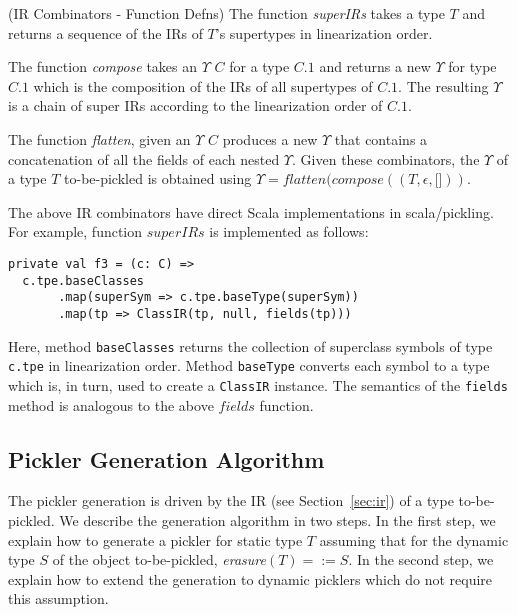 \begin{defn}{(IR Combinators - Function Defns)}
The function \textit{superIRs} takes a type $T$ and returns a sequence of the
IRs of $T$'s supertypes in linearization order.

The function \textit{compose} takes an $\Upsilon$ $C$ for a type $C.1$ and returns a
new $\Upsilon$ for type $C.1$ which is the composition of the IRs of all supertypes
of $C.1$. The resulting $\Upsilon$ is a chain of super IRs according to the
linearization order of $C.1$.

The function \textit{flatten}, given an $\Upsilon$ $C$ produces a new $\Upsilon$ that
contains a concatenation of all the fields of each nested $\Upsilon$. Given
these combinators, the $\Upsilon$ of a type $T$ to-be-pickled is obtained
using $\Upsilon = flatten(compose((T, \epsilon, \lbrack \rbrack))$.
\end{defn}



The above IR combinators have direct Scala implementations in scala/pickling.
For example, function $superIRs$ is implemented as follows:

\begin{lstlisting}
private val f3 = (c: C) =>
  c.tpe.baseClasses
       .map(superSym => c.tpe.baseType(superSym))
       .map(tp => ClassIR(tp, null, fields(tp)))
\end{lstlisting}
\noindent
Here, method \verb|baseClasses| returns the collection of superclass symbols
of type \verb|c.tpe| in linearization order. Method \verb|baseType| converts
each symbol to a type which is, in turn, used to create a \verb|ClassIR|
instance. The semantics of the \verb|fields| method is analogous to the above
$fields$ function.

\subsection{Pickler Generation Algorithm}

The pickler generation is driven by the IR (see Section~\ref{sec:ir}) of a
type to-be-pickled. We describe the generation algorithm in two steps. In the
first step, we explain how to generate a pickler for static type $T$ assuming
that for the dynamic type $S$ of the object to-be-pickled,
\textit{erasure}$(T) =:= S$. In the second step, we explain how to extend the
generation to dynamic picklers which do not require this assumption.

